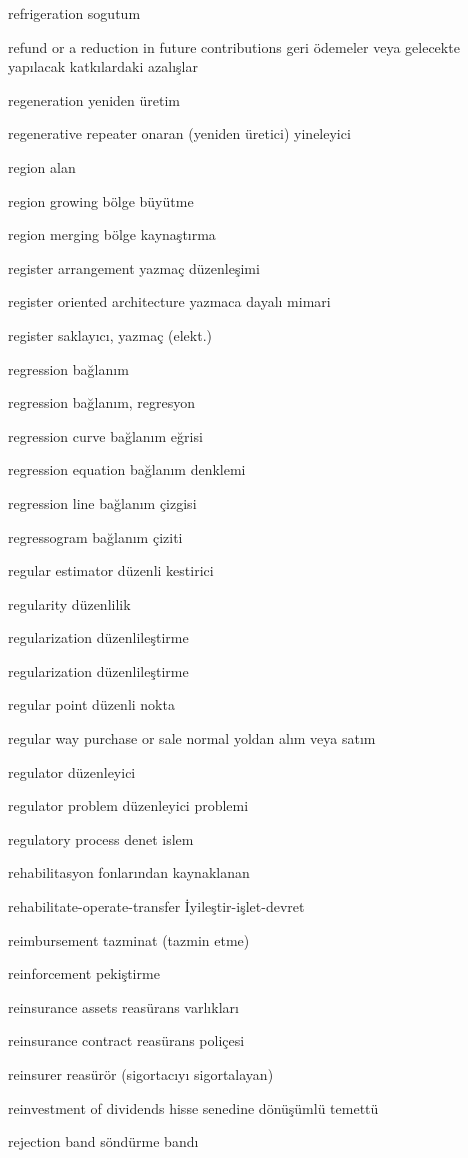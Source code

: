 \documentclass[12pt,fleqn]{article}\usepackage{../../common}
\begin{document}
refrigeration sogutum

refund or a reduction in future contributions geri ödemeler veya gelecekte yapılacak katkılardaki azalışlar

regeneration yeniden üretim

regenerative repeater onaran (yeniden üretici) yineleyici

region alan

region growing bölge büyütme

region merging bölge kaynaştırma

register arrangement yazmaç düzenleşimi

register oriented architecture yazmaca dayalı mimari

register saklayıcı, yazmaç (elekt.)

regression bağlanım

regression bağlanım, regresyon

regression curve bağlanım eğrisi

regression equation bağlanım denklemi

regression line bağlanım çizgisi

regressogram bağlanım çiziti

regular estimator düzenli kestirici

regularity düzenlilik

regularization düzenlileştirme

regularization düzenlileştirme

regular point düzenli nokta

regular way purchase or sale normal yoldan alım veya satım

regulator düzenleyici

regulator problem düzenleyici problemi

regulatory process denet islem

rehabilitasyon fonlarından kaynaklanan

rehabilitate-operate-transfer İyileştir-işlet-devret

reimbursement tazminat (tazmin etme)

reinforcement pekiştirme

reinsurance assets reasürans varlıkları

reinsurance contract reasürans poliçesi

reinsurer reasürör (sigortacıyı sigortalayan)

reinvestment of dividends hisse senedine dönüşümlü temettü

rejection band söndürme bandı
\end{document}
